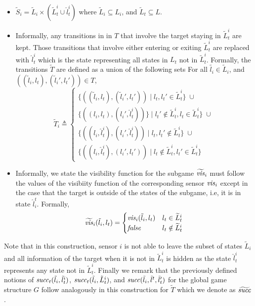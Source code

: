 \begin{itemize}
\item $\widetilde{S}_i= \widetilde{L}_i \times (\widetilde{L}^i_t \cup \hat{l}^i_t)$ where $\widetilde{L}_i\subseteq L_i$, and $\widetilde{L}_t \subseteq L$. 
\item Informally, any transitions in in $T$ that involve the target staying in $\widetilde{L}^i_t$ are kept. Those transitions that involve either entering or exiting $\widetilde{L}^i_t$ are replaced with $\hat{l}^i_t$ which is the state representing all states in $L_t$ not in $\widetilde{L}^i_t$. Formally, the transitions $\widetilde{T}$ are defined as a union of the following sets  For all $\tilde{l_i} \in \widetilde{L}_i$, and $((\tilde{l}_i,l_t),(\tilde{l}_i',l_t')) \in T$, \[\widetilde{T}_i \triangleq \begin{cases}
 \{((\tilde{l}_i,l_t),(\tilde{l}_i',l_t')) \mid l_t,l_t' \in \widetilde{L}^i_t \} \; \cup \\
 \{((l_i,l_t),(l_i',\hat{l}^i_t)) \} \mid l_t' \notin \widetilde{L}_t^i, l_t \in \widetilde{L}_t^i \}  \; \cup \\
 \{((l_i,\hat{l}^i_t),(l_i',\hat{l}^i_t)) \mid l_t,l_t' \notin \widetilde{L}_t^i \}  \; \cup \\
 \{((l_i,\hat{l}^i_t),(l_i',l_t')) \mid l_t \notin \widetilde{L}_t^i, l_t' \in \widetilde{L}_t^i \} 
  \end{cases}   \]
  
\item Informally, we state the visibility function for the subgame $\widetilde{\mathit{vis}}_i$ must follow the values of the visibiity function of the corresponding sensor $\mathit{vis}_i$ except in the case that the target is outside of the states of the subgame, i.e, it is in state $\hat{l}^t_i$. Formally,  \[\widetilde{\mathit{vis}}_i(\tilde{l}_i,l_t) = \begin{cases}
\mathit{vis}_i(\tilde{l}_i,l_t) & l_t \in \widetilde{L}_t^i \\
\mathit{false} & l_t \notin \widetilde{L}_t^i
\end{cases}
\]
\end{itemize}
Note that in this construction, sensor $i$ is not able to leave the subset of states $\tilde{L}_i$ and all information of the target when it is not in $\tilde{L}_t^i$ is hidden as the state $\hat{l}_t^i$ represents any state not in $\tilde{L}_t^i$. Finally we remark that the previously defined notions of $\mathit{succ}_t(\tilde{l}_i,\tilde{l}^i_{t})$, $\mathit{succ}_t(\tilde{l}_i,\tilde{L}^i_{t})$, and $\mathit{succ}(\tilde{l}_i,\tilde{l}^{t},\tilde{l}_{t}')$ for the global game structure $G$ follow analogously in this construction for $\widetilde{T}$ which we denote as $\widetilde{\mathit{succ}}$.

